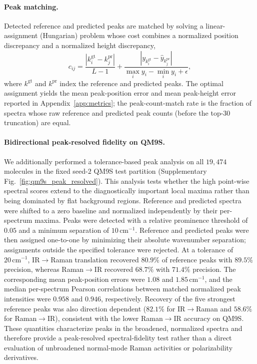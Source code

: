 \documentclass[pdflatex,sn-mathphys-num]{sn-jnl}%
\theoremstyle{thmstyleone}%
\theoremstyle{thmstyletwo}%
\theoremstyle{thmstylethree}%
\begin{document}
\begin{appendices}
\paragraph{Peak matching.} Detected reference and predicted peaks are matched by solving a linear-assignment (Hungarian) problem whose cost combines a normalized position discrepancy and a normalized height discrepancy,
\[
c_{ij}=\frac{|k^{\mathrm{gt}}_i-k^{\mathrm{pr}}_j|}{L-1}+\frac{|y_{k^{\mathrm{gt}}_i}-\hat y_{k^{\mathrm{pr}}_j}|}{\max_i y_i-\min_i y_i+\epsilon},
\]
where $k^{\mathrm{gt}}$ and $k^{\mathrm{pr}}$ index the reference and predicted peaks. The optimal assignment yields the mean peak-position error and mean peak-height error reported in Appendix~\ref{app:metrics}; the peak-count-match rate is the fraction of spectra whose raw reference and predicted peak counts (before the top-$30$ truncation) are equal.

\paragraph{Bidirectional peak-resolved fidelity on QM9S.}
We additionally performed a tolerance-based peak analysis on all $19{,}474$ molecules in the fixed seed-$2$ QM9S test partition (Supplementary Fig.~\ref{fig:qm9s_peak_resolved}). This analysis tests whether the high point-wise spectral scores extend to the diagnostically important local maxima rather than being dominated by flat background regions. Reference and predicted spectra were shifted to a zero baseline and normalized independently by their per-spectrum maxima. Peaks were detected with a relative prominence threshold of $0.05$ and a minimum separation of $10\,\mathrm{cm}^{-1}$. Reference and predicted peaks were then assigned one-to-one by minimizing their absolute wavenumber separation; assignments outside the specified tolerance were rejected. At a tolerance of $20\,\mathrm{cm}^{-1}$, IR$\rightarrow$Raman translation recovered $80.9\%$ of reference peaks with $89.5\%$ precision, whereas Raman$\rightarrow$IR recovered $68.7\%$ with $71.4\%$ precision. The corresponding mean peak-position errors were $1.08$ and $1.85\,\mathrm{cm}^{-1}$, and the median per-spectrum Pearson correlations between matched normalized peak intensities were $0.958$ and $0.946$, respectively. Recovery of the five strongest reference peaks was also direction dependent ($82.1\%$ for IR$\rightarrow$Raman and $58.6\%$ for Raman$\rightarrow$IR), consistent with the lower Raman$\rightarrow$IR accuracy on QM9S. These quantities characterize peaks in the broadened, normalized spectra and therefore provide a peak-resolved spectral-fidelity test rather than a direct evaluation of unbroadened normal-mode Raman activities or polarizability derivatives.


\end{appendices}
\end{document}
